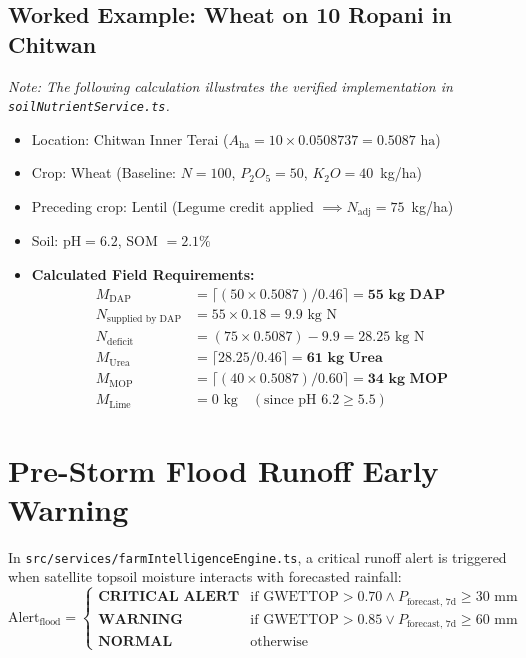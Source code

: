 \documentclass[11pt,a4paper]{report}
\begin{document}
\subsection{Worked Example: Wheat on 10 Ropani in Chitwan}
\textit{Note: The following calculation illustrates the verified implementation in \texttt{soilNutrientService.ts}.}
\begin{itemize}
  \item Location: Chitwan Inner Terai ($A_{\text{ha}} = 10 \times 0.0508737 = 0.5087\text{ ha}$)
  \item Crop: Wheat (Baseline: $N=100$, $P_2O_5=50$, $K_2O=40$~kg/ha)
  \item Preceding crop: Lentil (Legume credit applied $\implies N_{\text{adj}} = 75$~kg/ha)
  \item Soil: $\text{pH} = 6.2$, SOM $= 2.1\%$
  \item \textbf{Calculated Field Requirements:}
  \begin{align*}
    M_{\text{DAP}} &= \lceil (50 \times 0.5087) / 0.46 \rceil = \mathbf{55\text{ kg DAP}} \\
    N_{\text{supplied by DAP}} &= 55 \times 0.18 = 9.9\text{ kg N} \\
    N_{\text{deficit}} &= (75 \times 0.5087) - 9.9 = 28.25\text{ kg N} \\
    M_{\text{Urea}} &= \lceil 28.25 / 0.46 \rceil = \mathbf{61\text{ kg Urea}} \\
    M_{\text{MOP}} &= \lceil (40 \times 0.5087) / 0.60 \rceil = \mathbf{34\text{ kg MOP}} \\
    M_{\text{Lime}} &= 0\text{ kg} \quad (\text{since } \text{pH } 6.2 \ge 5.5)
  \end{align*}
\end{itemize}

\section{Pre-Storm Flood Runoff Early Warning}
In \texttt{src/services/farmIntelligenceEngine.ts}, a critical runoff alert is triggered when satellite topsoil moisture interacts with forecasted rainfall:
\begin{equation}
  \text{Alert}_{\text{flood}} = \begin{cases}
    \textbf{CRITICAL ALERT} & \text{if } \text{GWETTOP} > 0.70 \land P_{\text{forecast, 7d}} \ge 30\text{ mm} \\
    \textbf{WARNING} & \text{if } \text{GWETTOP} > 0.85 \lor P_{\text{forecast, 7d}} \ge 60\text{ mm} \\
    \textbf{NORMAL} & \text{otherwise}
  \end{cases}
\end{equation}
\end{document}

